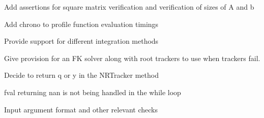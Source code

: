 
\begin{DoxyRefList}
\item[Member \mbox{\hyperlink{utils_8h_ad2246d831bd56822936b616e92e12b76}{Linear\+Solve}} (Matrix\+Xd Amat, Vector\+Xd bvec)]\label{todo__todo000005}%
%
Add assertions for square matrix verification and verification of sizes of A and b  
\item[Class \mbox{\hyperlink{classRootTracker}{Root\+Tracker}} ]\label{todo__todo000004}%
%
Add chrono to profile function evaluation timings  
\item[Member \mbox{\hyperlink{classRootTracker_ad6972a32664292d78516340027947bb5}{Root\+Tracker::D\+M\+Tracker}} (Vector\+Xd x, Vector\+Xd y, std\+::function$<$ Vector\+Xd(\+Vector\+Xd)$>$ Jfx, std\+::function$<$ Matrix\+Xd(\+Vector\+Xd)$>$ Jfy, double eps=0, std\+::function$<$ Vector\+Xd(\+Vector\+Xd)$>$ f=N\+U\+LL)]\label{todo__todo000003}%
%
Provide support for different integration methods  
\item[Member \mbox{\hyperlink{classRootTracker_a89ffd1af75e3bf434065b736623bbf17}{Root\+Tracker::methods}} ()]\label{todo__todo000001}%
%
Give provision for an FK solver along with root trackers to use when trackers fail.  
\item[Member \mbox{\hyperlink{classRootTracker_a6bb3dcb73ea58ac44ab15d7803de3d5a}{Root\+Tracker::N\+R\+Tracker}} (Vector\+Xd x, Vector\+Xd y, std\+::function$<$ Vector\+Xd(\+Vector\+Xd)$>$ f, std\+::function$<$ Matrix\+Xd(\+Vector\+Xd)$>$ Jfy, double eps=pow(10, -\/10))]\label{todo__todo000002}%
%
Decide to return q or y in the N\+R\+Tracker method 

fval returning nan is not being handled in the while loop 

Input argument format and other relevant checks 
\end{DoxyRefList}